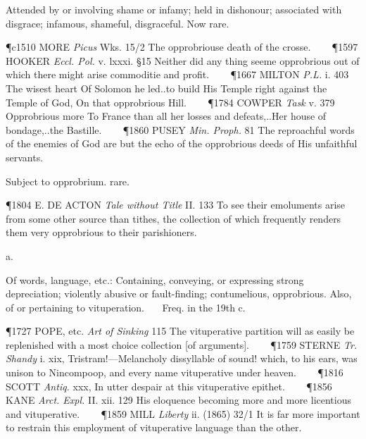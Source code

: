 \begin{description}[wide, labelwidth=!, labelindent=0pt]
\begin{myenumerate}
 Attended by or involving shame or infamy; held in dishonour; associated with disgrace; infamous, shameful, disgraceful. Now rare.

\P c1510 MORE  \textit{Picus} Wks. 15/2 The opprobriouse death of the crosse.    
\P 1597 HOOKER  \textit{Eccl. Pol.} v. lxxxi. §15 Neither did any thing seeme opprobrious out of which there might arise commoditie and profit.    
\P 1667 MILTON  \textit{P.L.} i. 403 The wisest heart Of Solomon he led..to build His Temple right against the Temple of God, On that opprobrious Hill.    
\P 1784 COWPER  \textit{Task} v. 379 Opprobrious more To France than all her losses and defeats,..Her house of bondage,..the Bastille.    
\P 1860 PUSEY  \textit{Min. Proph.} 81 The reproachful words of the enemies of God are but the echo of the opprobrious deeds of His unfaithful servants.

 Subject to opprobrium. rare.

\P 1804 E. DE ACTON  \textit{Tale without Title} II. 133 To see their emoluments arise from some other source than tithes, the collection of which frequently renders them very opprobrious to their parishioners.
\end{myenumerate}


 a.

\noindent {}

\vspace{-0.3cm}

\begin{myenumerate}

 Of words, language, etc.: Containing, conveying, or expressing strong depreciation; violently abusive or fault-finding; contumelious, opprobrious. Also, of or pertaining to vituperation.
   Freq. in the 19th c.

\P 1727 POPE, etc. \textit{Art of Sinking} 115 The vituperative partition will as easily be replenished with a most choice collection [of arguments].    
\P 1759 STERNE  \textit{Tr. Shandy} i. xix, Tristram!—Melancholy dissyllable of sound! which, to his ears, was unison to Nincompoop, and every name vituperative under heaven.    
\P 1816 SCOTT  \textit{Antiq.} xxx, In utter despair at this vituperative epithet.    
\P 1856 KANE  \textit{Arct. Expl.} II. xii. 129 His eloquence becoming more and more licentious and vituperative.    
\P 1859 MILL  \textit{Liberty} ii. (1865) 32/1 It is far more important to restrain this employment of vituperative language than the other.


\end{myenumerate}
\end{description}
